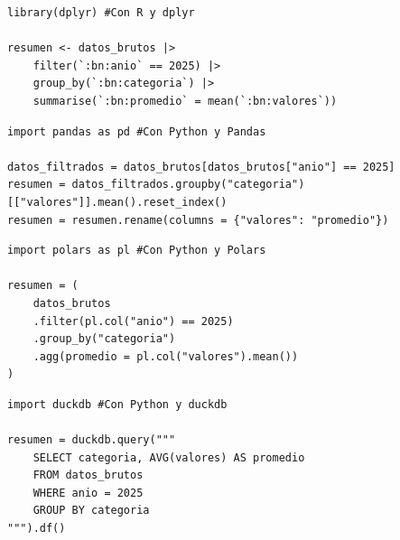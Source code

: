 \documentclass[8pt]{beamer}
\begin{document}
	
	\begin{frame}[fragile]
\begin{lstlisting}[style=RScript]
library(dplyr) #Con R y dplyr

resumen <- datos_brutos |>
	filter(`:bn:anio` == 2025) |>
	group_by(`:bn:categoria`) |>
	summarise(`:bn:promedio` = mean(`:bn:valores`))
\end{lstlisting}		

\begin{lstlisting}[style=PythonScript]
import pandas as pd #Con Python y Pandas

datos_filtrados = datos_brutos[datos_brutos["anio"] == 2025]
resumen = datos_filtrados.groupby("categoria")[["valores"]].mean().reset_index()
resumen = resumen.rename(columns = {"valores": "promedio"})
\end{lstlisting}


\begin{lstlisting}[style=PythonScript]
import polars as pl #Con Python y Polars

resumen = (
	datos_brutos
	.filter(pl.col("anio") == 2025)
	.group_by("categoria")
	.agg(promedio = pl.col("valores").mean())
)
\end{lstlisting}


\begin{lstlisting}[style=PythonScript]
import duckdb #Con Python y duckdb

resumen = duckdb.query("""
	SELECT categoria, AVG(valores) AS promedio
	FROM datos_brutos
	WHERE anio = 2025
	GROUP BY categoria
""").df()
\end{lstlisting}
	\end{frame}
	
	
	
\end{document}
